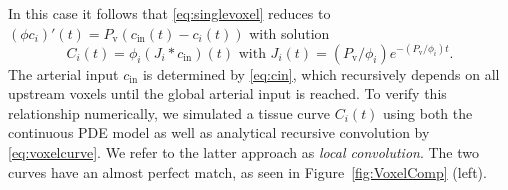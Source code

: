 \documentclass[final,5p,times,twocolumn]{elsarticle}
\begin{document}
	In this case it follows that \eqref{eq:singlevoxel} reduces to $(\phi c_i)'(t) = P_{\mathrm{v}} (c_\mathrm{in}(t) - c_i(t))$ 
	with solution
	\begin{equation}\label{eq:voxelcurve}
		C_i(t) = \phi_i(J_i*c_{\mathrm{in}})(t)
			\text{  with  } J_i(t)=(P_{\mathrm{v}}/\phi_i)e^{- (P_{\mathrm{v}}/\phi_i)t}.
	\end{equation}
	The arterial input $c_{\mathrm{in}}$ is determined by \eqref{eq:cin}, which recursively depends on all upstream voxels until the global arterial input is reached.
	To verify this relationship numerically, we simulated a tissue curve $C_i(t)$ using both the continuous PDE model as well as analytical recursive convolution by \eqref{eq:voxelcurve}.
	We refer to the latter approach as \textit{local convolution}. The two curves have an almost perfect match, as seen in Figure~\ref{fig:VoxelComp} (left).	
\end{document}
